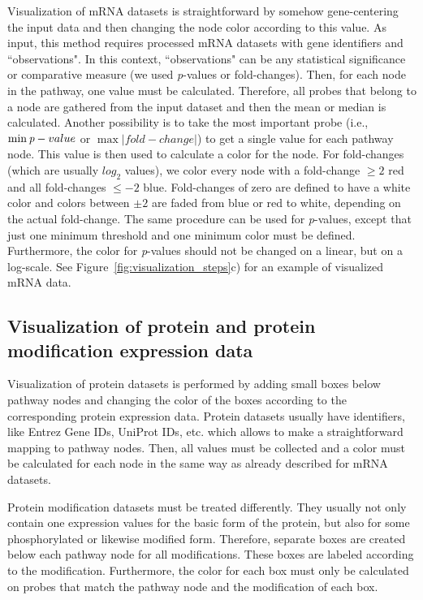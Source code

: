 \documentclass{bioinfo}
\begin{document}
Visualization of mRNA datasets is straightforward by somehow gene-centering the input data and then changing the node color according to this value. As input, this method requires processed mRNA datasets with gene identifiers and ``observations". In this context, ``observations" can be any statistical significance or comparative measure (we used \emph{p}-values or fold-changes). Then, for each node in the pathway, one value must be calculated. Therefore, all probes that belong to a node are gathered from the input dataset and then the mean or median is calculated. Another possibility is to take the most important probe (i.e., $\min\emph{p}-value$ or $\max|fold-change|$) to get a single value for each pathway node.
This value is then used to calculate a color for the node. For fold-changes (which are usually $log_2$ values), we color every node with a fold-change $\geq2$ red and all fold-changes $\leq-2$ blue. Fold-changes of zero are defined to have a white color and colors between $\pm2$ are faded from blue or red to white, depending on the actual fold-change. The same procedure can be used for \emph{p}-values, except that just one minimum threshold and one minimum color must be defined. Furthermore, the color for \emph{p}-values should not be changed on a linear, but on a log-scale. See Figure~\ref{fig:visualization_steps}c) for an example of visualized mRNA data.

\subsection{Visualization of protein and protein modification expression data}

Visualization of protein datasets is performed by adding small boxes below pathway nodes and changing the color of the boxes according to the corresponding protein expression data. Protein datasets usually have identifiers, like Entrez Gene IDs, UniProt IDs, etc. which allows to make a straightforward mapping to pathway nodes. Then, all values must be collected and a color must be calculated for each node in the same way as already described for mRNA datasets.


Protein modification datasets must be treated differently. They usually not only contain one expression values for the basic form of the protein, but also for some phosphorylated or likewise modified form. Therefore, separate boxes are created below each pathway node for all modifications. These boxes are labeled according to the modification. Furthermore, the color for each box must only be calculated on probes that match the pathway node and the modification of each box.
\end{document}
